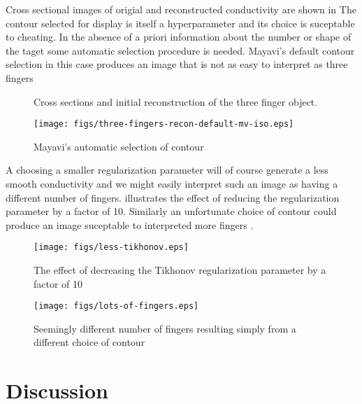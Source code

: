 \documentclass[12pt]{iopart}
\begin{document}
Cross sectional images of origial and reconstructed
conductivity are shown in 
The contour selected for display is itself a
hyperparameter and its choice is suceptable to
cheating. In the absence of a priori information about
the number or shape of the taget some automatic selection
procedure is needed. Mayavi's default contour selection
in this case produces an image that is not as easy to
interpret as three fingers 

%
%
\begin{figure}[th]

\caption{\label{fig:3fingersXsect}
Cross sections and initial reconstruction of the three finger object.}
\end{figure}

%
%
\begin{figure}[th]
\texttt{[image: figs/three-fingers-recon-default-mv-iso.eps]}
\caption{\label{fig:3fingersMVdefault}
Mayavi's automatic selection of contour}
\end{figure}
A choosing a smaller regularization parameter will of
course generate a less smooth conductivity and we might
easily interpret such an image as having a different number
of fingers.
 illustrates the effect of
reducing the regularization parameter by a factor of
10. Similarly an unfortunate choice of contour could
produce an image suceptable to interpreted more fingers
.
\begin{figure}[th]
\texttt{[image: figs/less-tikhonov.eps]}
\caption{\label{fig:3fingersLessTik}
The effect of decreasing the Tikhonov regularization parameter
 by a factor of 10}
\end{figure}
\begin{figure}[th]
\texttt{[image: figs/lots-of-fingers.eps]}
\caption{\label{fig:3fingersMoreFingers}
Seemingly different number of fingers resulting simply from a
 different choice of contour}
\end{figure}







\section{
 Discussion
}
\end{document}
